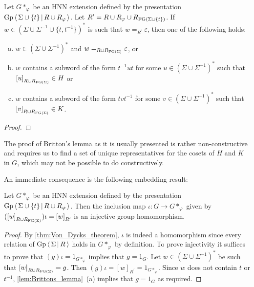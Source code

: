 \begin{lemma}%
  \label{lem:Brittons_lemma}
  Let $G\ast_\varphi$ be an HNN extension defined by the presentation
  $\textrm{Gp}\left\langle\, \Sigma \cup\{t\} \,\middle|\, R\cup R_\varphi \,\right\rangle$. Let
  $R^\prime = R\cup R_\varphi \cup R_{\textrm{FG}(\Sigma \cup \{t\})}$.
  If $w\in {\left(\Sigma \cup \Sigma^{-1} \cup \{t, t^{-1}\}\right)}^\ast$ is such that
  $w =_{R^\prime} \varepsilon$, then one of the following holds:
  \begin{enumerate}[(a)]
    \item $w\in {\left(\Sigma \cup \Sigma^{-1}\right)}^\ast$ and $w =_{R\cup R_{\textrm{FG}(\Sigma)}} \varepsilon$, or
    \item $w$ contains a subword of the form $t^{-1} u t$ for some
      $u \in {\left(\Sigma \cup \Sigma^{-1}\right)}^\ast$ such that ${[u]}_{R\cup R_{\textrm{FG}(\Sigma)}} \in H$ or
    \item $w$ contains a subword of the form $t v t^{-1}$ for some
      $v \in {\left(\Sigma \cup \Sigma^{-1}\right)}^\ast$ such that ${[v]}_{R\cup R_{\textrm{FG}(\Sigma)}} \in K$.
  \end{enumerate}
\end{lemma}
\begin{proof}
\end{proof}

The proof of Britton's lemma as it is usually presented is rather non-constructive and requires
us to find a set of unique representatives for the cosets of $H$ and $K$ in $G$, which may not be
possible to do constructively.

An immediate consequence is the following embedding result:

\begin{lemma}%
  \label{lem:HNN_embedding}
  Let $G\ast_\varphi$ be an HNN extension defined by the presentation
  $\textrm{Gp}\left\langle\, \Sigma \cup\{t\} \,\middle|\, R\cup R_\varphi \,\right\rangle$. Then the inclusion map
  $\iota: G\rightarrow G\ast_\varphi$ given by
  $({[w]}_{R\cup R_{\textrm{FG}(\Sigma)}})\iota = {[w]}_{R^\prime}$ is an injective group homomorphism.
\end{lemma}
\begin{proof}
  By \cref{thm:Von_Dycks_theorem}, $\iota$ is indeed a homomorphism since
  every relation of $\textrm{Gp}\left\langle\, \Sigma \,\middle|\, R \,\right\rangle$ holds in $G\ast_\varphi$ by definition.
  To prove injectivity it suffices to prove that
  $(g)\iota = 1_{G\ast_\varphi}$ implies that $g = 1_G$.
  Let $w\in {\left(\Sigma \cup \Sigma^{-1}\right)}^\ast$ be such that ${[w]}_{R\cup R_{\textrm{FG}(\Sigma)}} = g$. Then
  $(g)\iota = {[w]}_{R^\prime} = 1_{G\ast_\varphi}$. Since $w$ does not contain $t$ or $t^{-1}$,
  \cref{lem:Brittons_lemma}~(a) implies that $g = 1_G$ as required.
\end{proof}

